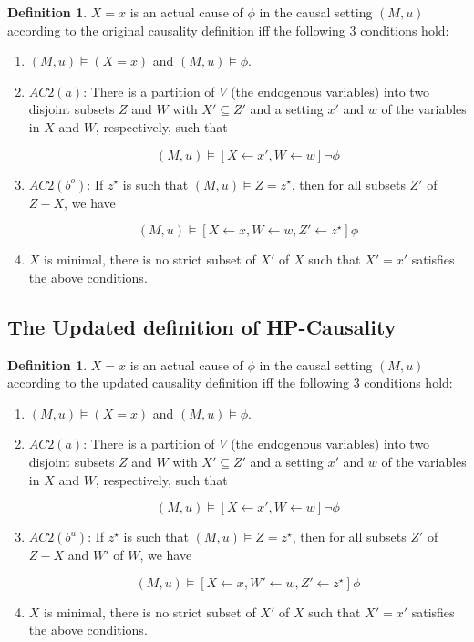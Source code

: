 \documentclass{article}
\theoremstyle{plain}
\theoremstyle{definition}
\newtheorem{defn}[thm]{Definition} %
\begin{document}
\begin{defn}$X=x$ is an actual cause of $\phi$ in the causal setting $(M,u)$ according to the original causality definition iff the following 3 conditions hold:
\begin{enumerate}
\item $(M,u) \models (X=x)$ and $(M,u) \models \phi$.
\item $AC2(a)$: There is a partition of $V$ (the endogenous variables) into two disjoint subsets $Z$ and $W$ with $X'\subseteq Z'$ and a setting $x'$ and $w$ of the variables in $X$ and $W$, respectively, such that

\[
(M,u) \models [X\leftarrow x', W\leftarrow w]\lnot \phi
\] 

\item $AC2(b^o)$: If $z^\star$ is such that $(M,u)\models Z = z^\star$, then for all subsets $Z'$ of $Z-X$, we have

\[
(M,u) \models [X\leftarrow x, W \leftarrow w, Z' \leftarrow z^\star]\phi
\] 

\item $X$ is minimal, there is no strict subset of $X'$ of $X$ such that $X' = x'$ satisfies the above conditions.
\end{enumerate}

\end{defn}

\subsection{The Updated definition of HP-Causality}
\begin{defn}$X=x$ is an actual cause of $\phi$ in the causal setting $(M,u)$ according to the updated causality definition iff the following 3 conditions hold:
\begin{enumerate}
\item $(M,u) \models (X=x)$ and $(M,u) \models \phi$.
\item $AC2(a)$: There is a partition of $V$ (the endogenous variables) into two disjoint subsets $Z$ and $W$ with $X'\subseteq Z'$ and a setting $x'$ and $w$ of the variables in $X$ and $W$, respectively, such that

\[
(M,u) \models [X\leftarrow x', W\leftarrow w]\lnot \phi
\] 

\item $AC2(b^u)$: If $z^\star$ is such that $(M,u)\models Z = z^\star$, then for all subsets $Z'$ of $Z-X$ and $W'$ of $W$, we have

\[
(M,u) \models [X\leftarrow x, W' \leftarrow w, Z' \leftarrow z^\star]\phi
\] 

\item $X$ is minimal, there is no strict subset of $X'$ of $X$ such that $X' = x'$ satisfies the above conditions.
\end{enumerate}

\end{defn}
\end{document}
